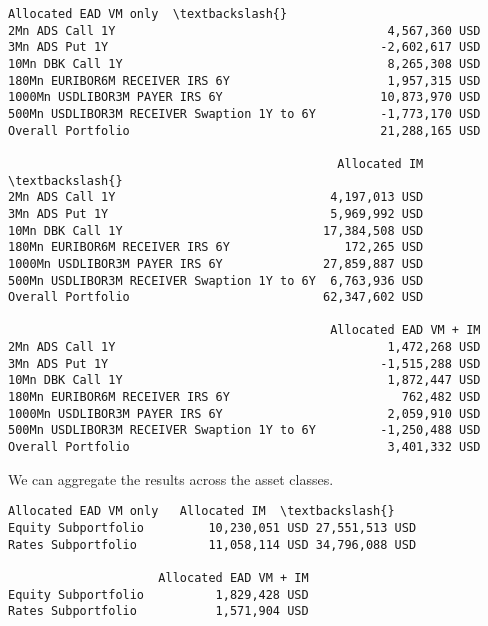             \begin{tcolorbox}[breakable, size=fbox, boxrule=.5pt, pad at break*=1mm, opacityfill=0]
\begin{Verbatim}[commandchars=\\\{\}]
                                             Allocated EAD VM only  \textbackslash{}
2Mn ADS Call 1Y                                      4,567,360 USD
3Mn ADS Put 1Y                                      -2,602,617 USD
10Mn DBK Call 1Y                                     8,265,308 USD
180Mn EURIBOR6M RECEIVER IRS 6Y                      1,957,315 USD
1000Mn USDLIBOR3M PAYER IRS 6Y                      10,873,970 USD
500Mn USDLIBOR3M RECEIVER Swaption 1Y to 6Y         -1,773,170 USD
Overall Portfolio                                   21,288,165 USD

                                              Allocated IM  \textbackslash{}
2Mn ADS Call 1Y                              4,197,013 USD
3Mn ADS Put 1Y                               5,969,992 USD
10Mn DBK Call 1Y                            17,384,508 USD
180Mn EURIBOR6M RECEIVER IRS 6Y                172,265 USD
1000Mn USDLIBOR3M PAYER IRS 6Y              27,859,887 USD
500Mn USDLIBOR3M RECEIVER Swaption 1Y to 6Y  6,763,936 USD
Overall Portfolio                           62,347,602 USD

                                             Allocated EAD VM + IM
2Mn ADS Call 1Y                                      1,472,268 USD
3Mn ADS Put 1Y                                      -1,515,288 USD
10Mn DBK Call 1Y                                     1,872,447 USD
180Mn EURIBOR6M RECEIVER IRS 6Y                        762,482 USD
1000Mn USDLIBOR3M PAYER IRS 6Y                       2,059,910 USD
500Mn USDLIBOR3M RECEIVER Swaption 1Y to 6Y         -1,250,488 USD
Overall Portfolio                                    3,401,332 USD
\end{Verbatim}
\end{tcolorbox}
        
    We can aggregate the results across the asset classes.

            \begin{tcolorbox}[breakable, size=fbox, boxrule=.5pt, pad at break*=1mm, opacityfill=0]
\begin{Verbatim}[commandchars=\\\{\}]
                     Allocated EAD VM only   Allocated IM  \textbackslash{}
Equity Subportfolio         10,230,051 USD 27,551,513 USD
Rates Subportfolio          11,058,114 USD 34,796,088 USD

                     Allocated EAD VM + IM
Equity Subportfolio          1,829,428 USD
Rates Subportfolio           1,571,904 USD
\end{Verbatim}
\end{tcolorbox}
        

